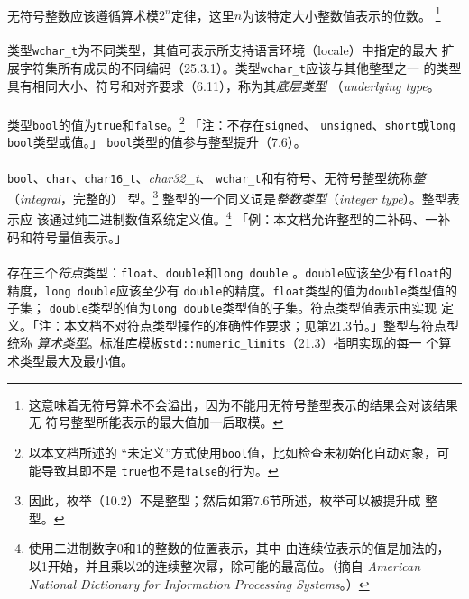 \paragraph{}
无符号整数应该遵循算术模$2^n$定律，这里$n$为该特定大小整数值表示的位数。
\footnote{这意味着无符号算术不会溢出，因为不能用无符号整型表示的结果会对该结果无
符号整型所能表示的最大值加一后取模。}

\paragraph{}
类型\texttt{wchar\_t}为不同类型，其值可表示所支持语言环境（locale）中指定的最大
扩展字符集所有成员的不同编码（25.3.1）。类型\texttt{wchar\_t}应该与其他整型之一
的类型具有相同大小、符号和对齐要求（6.11），称为其\textit{底层类型}
（\textit{underlying type}。

\paragraph{}
类型\texttt{bool}的值为\texttt{true}和\texttt{false}。\footnote{以本文档所述的
``未定义''方式使用\texttt{bool}值，比如检查未初始化自动对象，可能导致其即不是
\texttt{true}也不是\texttt{false}的行为。} 「注：不存在\texttt{signed}、
\texttt{unsigned}、\texttt{short}或\texttt{long} \texttt{bool}类型或值。」
\texttt{bool}类型的值参与整型提升（7.6）。

\paragraph{}
\texttt{bool}、\texttt{char}、\texttt{char16\_t}、\textit{char32\_t}、
\texttt{wchar\_t}和有符号、无符号整型统称\textit{整}（\textit{integral}，完整的）
型。\footnote{因此，枚举（10.2）不是整型；然后如第7.6节所述，枚举可以被提升成
整型。} 整型的一个同义词是\textit{整数类型}（\textit{integer type}）。整型表示应
该通过纯二进制数值系统定义值。\footnote{使用二进制数字0和1的整数的位置表示，其中
由连续位表示的值是加法的，以1开始，并且乘以2的连续整次幂，除可能的最高位。（摘自
\textit{American National Dictionary for Information Processing Systems}。）}
「例：本文档允许整型的二补码、一补码和符号量值表示。」

\paragraph{}
存在三个\textit{符点}类型：\texttt{float}、\texttt{double}和\texttt{long double}
。\texttt{double}应该至少有\texttt{float}的精度，\texttt{long double}应该至少有
\texttt{double}的精度。\texttt{float}类型的值为\texttt{double}类型值的子集；
\texttt{double}类型的值为\texttt{long double}类型值的子集。符点类型值表示由实现
定义。「注：本文档不对符点类型操作的准确性作要求；见第21.3节。」整型与符点型统称
\textit{算术类型}。标准库模板\texttt{std::numeric\_limits}（21.3）指明实现的每一
个算术类型最大及最小值。

